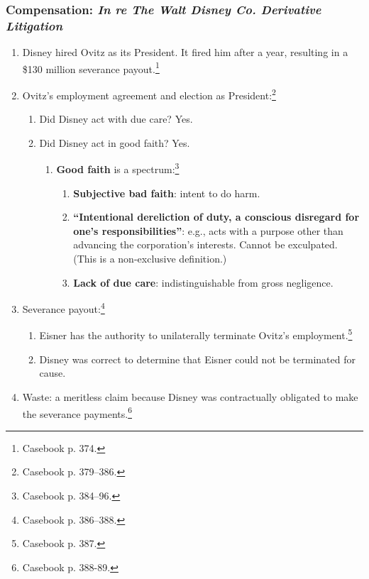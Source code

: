 \subsubsection{Compensation: \emph{In re The Walt Disney Co. Derivative Litigation}}

\begin{enumerate}
    \item Disney hired Ovitz as its President. It fired him after a year, 
    resulting in a \$130 million severance payout.\footnote{Casebook p. 374.}
    \item Ovitz's employment agreement and election as 
    President:\footnote{Casebook p. 379--386.}
    \begin{enumerate}
        \item Did Disney act with due care? Yes.
        \item Did Disney act in good faith? Yes.
        \begin{enumerate}
            \item \textbf{Good faith} is a spectrum:\footnote{Casebook p. 
            384--96.}
            \begin{enumerate}
                \item \textbf{Subjective bad faith}: intent to do harm.
                \item \textbf{``Intentional dereliction of duty, a conscious 
                disregard for one's responsibilities''}: e.g., acts with a 
                purpose other than advancing the corporation's interests. 
                Cannot be exculpated. (This is a non-exclusive definition.)
                \item \textbf{Lack of due care}: indistinguishable from gross 
                negligence.
            \end{enumerate}
        \end{enumerate}
    \end{enumerate}
    \item Severance payout:\footnote{Casebook p. 386--388.}
    \begin{enumerate}
        \item Eisner has the authority to unilaterally terminate Ovitz's 
        employment.\footnote{Casebook p. 387.}
        \item Disney was correct to determine that Eisner could not be 
        terminated for cause.
    \end{enumerate}
    \item Waste: a meritless claim because Disney was contractually obligated 
    to make the severance payments.\footnote{Casebook p. 388-89.}
\end{enumerate}

